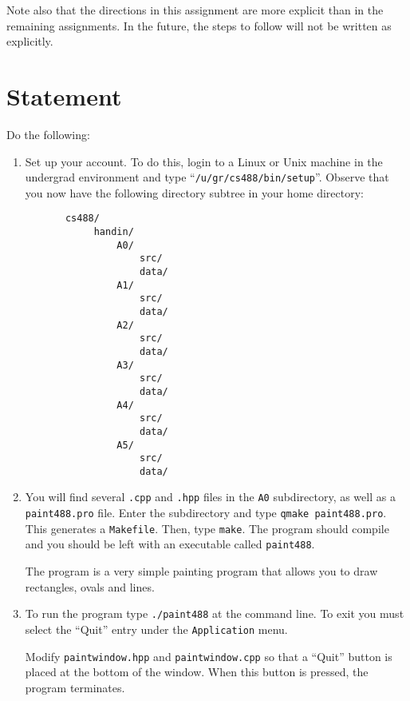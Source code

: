 Note also that the directions in this assignment are more explicit than
in the remaining assignments.  In the future, the steps to follow will
not be written as explicitly.

\section{Statement}
Do the following:
\begin{enumerate}
    \item
        Set up your account.  To do this, login to a Linux or Unix
        machine in the undergrad environment
        and type ``\texttt{/u/gr/cs488/bin/setup}''.
        Observe that you now have
        the following directory subtree in your home directory:
        \begin{verbatim}
       cs488/
            handin/
                A0/
                    src/
                    data/
                A1/
                    src/
                    data/
                A2/
                    src/
                    data/
                A3/
                    src/
                    data/
                A4/
                    src/
                    data/
                A5/
                    src/
                    data/
        \end{verbatim}

        \item
                You will find several \texttt{.cpp} and \texttt{.hpp}
                files in the \texttt{A0} subdirectory, as well as a
                \texttt{paint488.pro} file. Enter the subdirectory and type 
                \texttt{qmake paint488.pro}. This generates a 
                \texttt{Makefile}. Then, type \texttt{make}. The program 
                should compile and you should be left with an executable called
                \texttt{paint488}.

                The program is a very simple painting program that
                allows you to draw rectangles, ovals and lines.

        \item
                To run the program type \texttt{./paint488} at the
                command line.  To exit you must select
                the ``Quit'' entry under the \texttt{Application} menu.

                Modify \texttt{paintwindow.hpp} and
                \texttt{paintwindow.cpp} so that a ``Quit'' button is
                placed at the bottom of the window.  When this button
                is pressed, the program terminates.


\end{enumerate}

